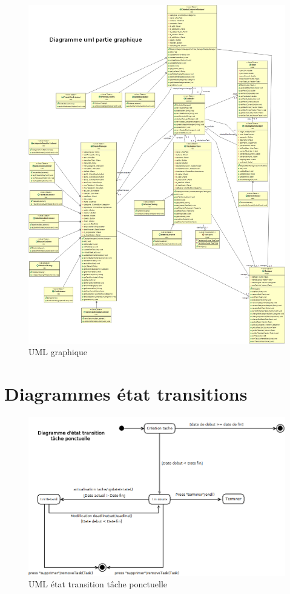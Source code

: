\documentclass{article}
\makeatletter
\def\bigcentering{\let\\\@centercr\rightskip\@bigflushglue%
\leftskip\@bigflushglue
\parindent\z@\parfillskip\z@skip}
\makeatother
\begin{document}
\begin{figure}[!h]
	\bigcentering	
	\includegraphics[scale=0.22]{UML/umlGraphic.png}
	\caption{UML graphique}
	\label{UML graphique}
\end{figure}

\section{Diagrammes état transitions}

\begin{figure}[!h]
	\bigcentering	
	\includegraphics[scale=0.34]{UML/tache_ponctuelle.png}
	\caption{UML état transition tâche ponctuelle}
	\label{UML état transition tâche ponctuelle}
\end{figure}
\end{document}
